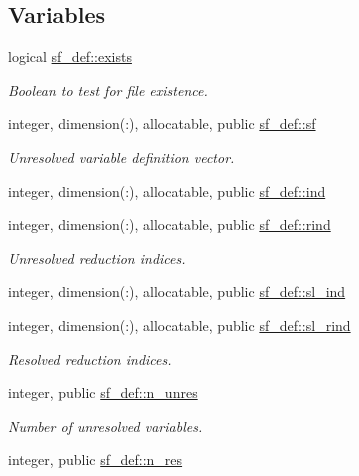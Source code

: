 \subsection*{Variables}
\begin{DoxyCompactItemize}
\item 
logical \hyperlink{namespacesf__def_a4461dcde80d3a5a5d53bb45e55839b5d}{sf\+\_\+def\+::exists}
\begin{DoxyCompactList}\small\item\em Boolean to test for file existence. \end{DoxyCompactList}\item 
integer, dimension(\+:), allocatable, public \hyperlink{namespacesf__def_ad000452ff3b9c4c5ce070c04d0521b52}{sf\+\_\+def\+::sf}
\begin{DoxyCompactList}\small\item\em Unresolved variable definition vector. \end{DoxyCompactList}\item 
integer, dimension(\+:), allocatable, public \hyperlink{namespacesf__def_a5e294b6f015b0b0499c9cee47da37627}{sf\+\_\+def\+::ind}
\item 
integer, dimension(\+:), allocatable, public \hyperlink{namespacesf__def_a2befe00671a3add2d8049605682bcd52}{sf\+\_\+def\+::rind}
\begin{DoxyCompactList}\small\item\em Unresolved reduction indices. \end{DoxyCompactList}\item 
integer, dimension(\+:), allocatable, public \hyperlink{namespacesf__def_a6b226546e7059222fad5500946c1c550}{sf\+\_\+def\+::sl\+\_\+ind}
\item 
integer, dimension(\+:), allocatable, public \hyperlink{namespacesf__def_aab6ba7881cef9b469ab9d9323f3fcbea}{sf\+\_\+def\+::sl\+\_\+rind}
\begin{DoxyCompactList}\small\item\em Resolved reduction indices. \end{DoxyCompactList}\item 
integer, public \hyperlink{namespacesf__def_a1e03f6f31a13f2bfa8e84dd69874b8aa}{sf\+\_\+def\+::n\+\_\+unres}
\begin{DoxyCompactList}\small\item\em Number of unresolved variables. \end{DoxyCompactList}\item 
integer, public \hyperlink{namespacesf__def_af05cacb04c0c2d10c9405e71db633a43}{sf\+\_\+def\+::n\+\_\+res}

\end{DoxyCompactItemize}
